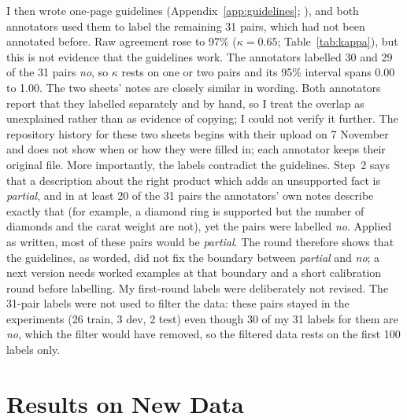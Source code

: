 \documentclass[11pt]{article}
\begin{document}
{\sloppy I then wrote one-page guidelines (Appendix~\ref{app:guidelines}; ), and both annotators used them to label the remaining 31 pairs, which had not been annotated before. Raw agreement rose to 97\% ($\kappa = 0.65$; Table~\ref{tab:kappa}), but this is not evidence that the guidelines work. The annotators labelled 30 and 29 of the 31 pairs \emph{no}, so $\kappa$ rests on one or two pairs and its 95\% interval spans 0.00 to 1.00. The two sheets' notes are closely similar in wording. Both annotators report that they labelled separately and by hand, so I treat the overlap as unexplained rather than as evidence of copying; I could not verify it further. The repository history for these two sheets begins with their upload on 7 November and does not show when or how they were filled in; each annotator keeps their original file. More importantly, the labels contradict the guidelines. Step~2 says that a description about the right product which adds an unsupported fact is \emph{partial}, and in at least 20 of the 31 pairs the annotators' own notes describe exactly that (for example, a diamond ring is supported but the number of diamonds and the carat weight are not), yet the pairs were labelled \emph{no}. Applied as written, most of these pairs would be \emph{partial}. The round therefore shows that the guidelines, as worded, did not fix the boundary between \emph{partial} and \emph{no}; a next version needs worked examples at that boundary and a short calibration round before labelling. My first-round labels were deliberately not revised. The 31-pair labels were not used to filter the data: these pairs stayed in the experiments (26 train, 3 dev, 2 test) even though 30 of my 31 labels for them are \emph{no}, which the filter would have removed, so the filtered data rests on the first 100 labels only.\par}


\section{Results on New Data}\label{sec:newresults}
\end{document}
